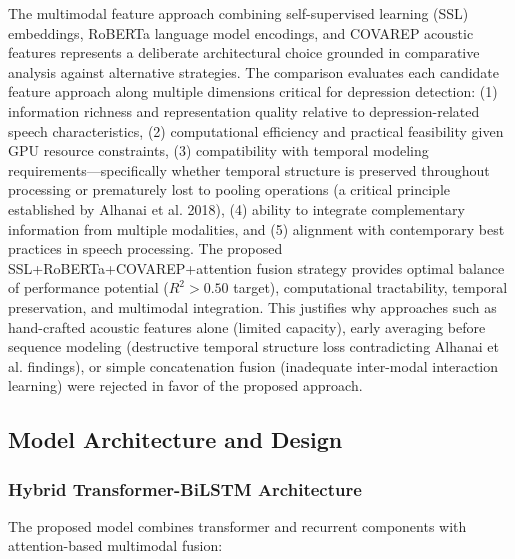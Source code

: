 \documentclass[12pt]{article}
\begin{document}
	The multimodal feature approach combining self-supervised learning (SSL) embeddings, RoBERTa language model encodings, and COVAREP acoustic features represents a deliberate architectural choice grounded in comparative analysis against alternative strategies. The comparison evaluates each candidate feature approach along multiple dimensions critical for depression detection: (1) information richness and representation quality relative to depression-related speech characteristics, (2) computational efficiency and practical feasibility given GPU resource constraints, (3) compatibility with temporal modeling requirements—specifically whether temporal structure is preserved throughout processing or prematurely lost to pooling operations (a critical principle established by Alhanai et al. 2018), (4) ability to integrate complementary information from multiple modalities, and (5) alignment with contemporary best practices in speech processing. The proposed SSL+RoBERTa+COVAREP+attention fusion strategy provides optimal balance of performance potential ($R^2 > 0.50$ target), computational tractability, temporal preservation, and multimodal integration. This justifies why approaches such as hand-crafted acoustic features alone (limited capacity), early averaging before sequence modeling (destructive temporal structure loss contradicting Alhanai et al. findings), or simple concatenation fusion (inadequate inter-modal interaction learning) were rejected in favor of the proposed approach.

	\subsection{Model Architecture and Design}

	\subsubsection{Hybrid Transformer-BiLSTM Architecture}

	The proposed model combines transformer and recurrent components with attention-based multimodal fusion:
\end{document}
